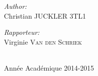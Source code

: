 \begin{titlepage}
\begin{minipage}{0.4\textwidth}
\begin{flushleft} \large
\emph{Author:}\\
Christian \textsc{JUCKLER} 3TL1 %
\end{flushleft}
\end{minipage}
\begin{minipage}{0.4\textwidth}
\begin{flushleft} \large
\emph{Rapporteur:} \\
Virginie \textsc{Van den Schriek} %
\end{flushleft}
\end{minipage}\\[4cm]



{\large Année Académique 2014-2015}\\[3cm] %

\vfill %

\end{titlepage}